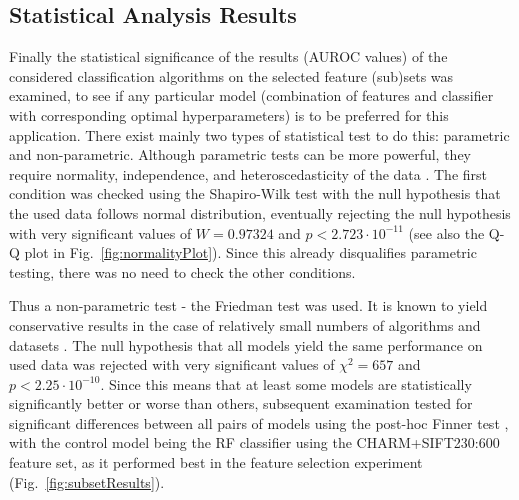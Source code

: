 \subsection{Statistical Analysis Results}
\label{subsec:experimentalAnalysis}
Finally the statistical significance of the results (AUROC values) of the considered classification algorithms on the selected feature (sub)sets was examined, to see if any particular model (combination of features and classifier with corresponding optimal hyperparameters) is to be preferred for this application. There exist mainly two types of statistical test to do this: parametric and non-parametric. Although parametric tests can be more powerful, they require normality, independence, and heteroscedasticity of the data \cite{fernandez2016methodology}. The first condition was checked using the Shapiro-Wilk test \cite{shapiro1965analysis} with the null hypothesis that the used data follows normal distribution, eventually rejecting the null hypothesis with very significant values of $W = 0.97324$ and $p < 2.723 \cdot 10^{-11}$ (see also the Q-Q plot in Fig.~\ref{fig:normalityPlot}). Since this already disqualifies parametric testing, there was no need to check the other conditions.

Thus a non-parametric test - the Friedman test \cite{friedman1940comparison} was used. It is known to yield conservative results in the case of relatively small numbers of algorithms and datasets \cite{garcia2010advanced}. The null hypothesis that all models yield the same performance on used data was rejected with very significant values of $\chi^2 = 657$ and $p < 2.25 \cdot 10^{-10}$. Since this means that at least some models are statistically significantly better or worse than others, subsequent examination tested for significant differences between all pairs of models using the post-hoc Finner test \cite{finner1993monotonicity}, with the control model being the RF classifier using the CHARM+SIFT230:600 feature set, as it performed best in the feature selection experiment (Fig.~\ref{fig:subsetResults}).


